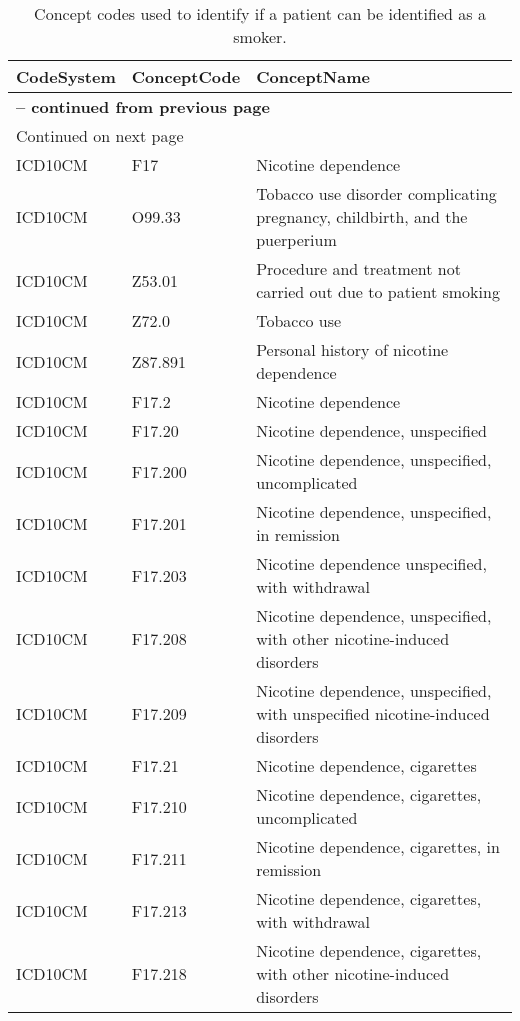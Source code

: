 \begin{longtable}{p{}p{}p{}}
\caption{Concept codes used to identify if a patient can be identified as a smoker.} \\ 
 CodeSystem & ConceptCode & ConceptName \\ 
  \hline 
\endfirsthead 
\multicolumn{3}{p{\textwidth}}{{ \bfseries \tablename \thetable{} -- continued from previous page}} \ 
\hline CodeSystem & ConceptCode & ConceptName \\ \hline 
\endhead 
\hline \multicolumn{3}{p{\textwidth}}{{Continued on next page}} \\ \hline 
\endfoot 
\hline 
\endlastfoot 
 \hline
ICD10CM & F17 & Nicotine dependence \\ 
  ICD10CM & O99.33 & Tobacco use disorder complicating pregnancy, childbirth, and the puerperium \\ 
  ICD10CM & Z53.01 & Procedure and treatment not carried out due to patient smoking \\ 
  ICD10CM & Z72.0 & Tobacco use \\ 
  ICD10CM & Z87.891 & Personal history of nicotine dependence \\ 
  ICD10CM & F17.2 & Nicotine dependence \\ 
  ICD10CM & F17.20 & Nicotine dependence, unspecified \\ 
  ICD10CM & F17.200 & Nicotine dependence, unspecified, uncomplicated \\ 
  ICD10CM & F17.201 & Nicotine dependence, unspecified, in remission \\ 
  ICD10CM & F17.203 & Nicotine dependence unspecified, with withdrawal \\ 
  ICD10CM & F17.208 & Nicotine dependence, unspecified, with other nicotine-induced disorders \\ 
  ICD10CM & F17.209 & Nicotine dependence, unspecified, with unspecified nicotine-induced disorders \\ 
  ICD10CM & F17.21 & Nicotine dependence, cigarettes \\ 
  ICD10CM & F17.210 & Nicotine dependence, cigarettes, uncomplicated \\ 
  ICD10CM & F17.211 & Nicotine dependence, cigarettes, in remission \\ 
  ICD10CM & F17.213 & Nicotine dependence, cigarettes, with withdrawal \\ 
  ICD10CM & F17.218 & Nicotine dependence, cigarettes, with other nicotine-induced disorders \\ 

\end{longtable}
